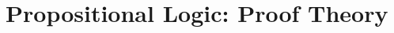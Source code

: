 \documentclass[a4paper, 11pt]{article} %
\newcommand{\V}[0]{\mathcal{V}}
\renewcommand{\L}[0]{\mathcal{L}}
\begin{document}





\section*{\sc Propositional Logic: Proof Theory}
\end{document}

